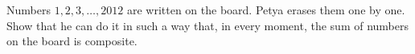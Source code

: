 \problem
Numbers $1, 2, 3, \ldots, 2012$ are written on the board.
Petya erases them one by one.
Show that he can do it in such a way that, in every moment, the sum of numbers
on the board is composite.
\solution
\endproblem
